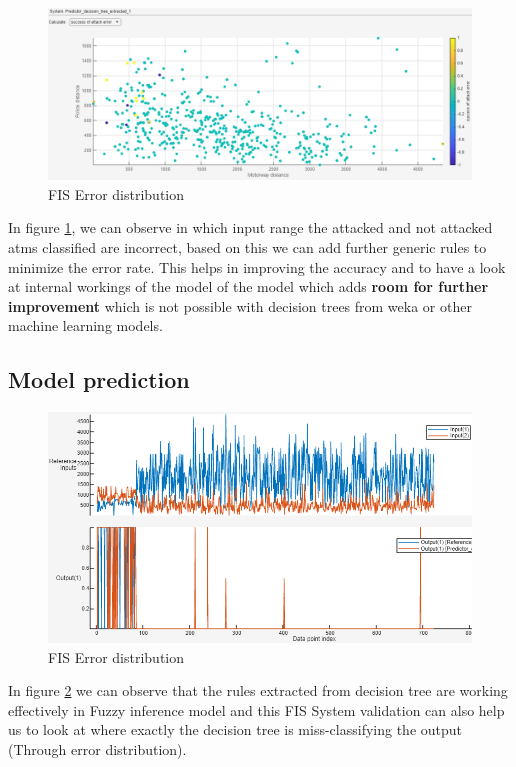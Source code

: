 \documentclass[10pt, conference, compsocconf]{IEEEtran}
\begin{document}
\begin{figure}[h!]
	\centering
	\includegraphics[width=\linewidth]{Fuzzy_final_error_distribution.png}
	\caption{FIS Error distribution}
	\label{FISED}
\end{figure}
    
    In figure \ref{FISED}, we can observe in which input range the attacked and not attacked atms classified are incorrect, based on this we can add further generic rules to minimize  the error rate.
    This helps in improving the accuracy and to have a look at internal workings of the model of the model which adds \textbf{room for further improvement} which is not possible with decision trees from weka or other machine learning models.
    
    \subsection{Model prediction}
    \begin{figure}[h!]
    	\centering
    	\includegraphics[width=\linewidth]{Fuzzy_final.png}
    	\caption{FIS Error distribution}
    	\label{FIS}
    \end{figure}
    
    In figure \ref{FIS} we can observe that the rules extracted from decision tree are working effectively in Fuzzy inference model and this FIS System validation can also help us to look at where exactly the decision tree is miss-classifying the output (Through error distribution).
    
\end{document}
